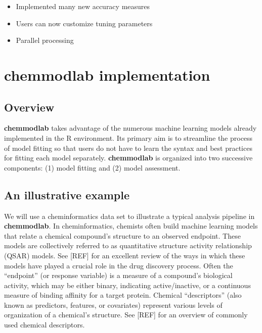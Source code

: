 \begin{itemize}
  \begin{itemize}
  \tightlist
  \item
    Implemented many new accuracy measures
  \item
    Users can now customize tuning parameters
  \item
    Parallel processing
  \end{itemize}
\end{itemize}

\section{chemmodlab implementation}\label{chemmodlab-implementation}

\subsection{Overview}\label{overview}

\textbf{chemmodlab} takes advantage of the numerous machine learning
models already implemented in the R environment. Its primary aim is to
streamline the process of model fitting so that users do not have to
learn the syntax and best practices for fitting each model separately.
\textbf{chemmodlab} is organized into two successive components: (1)
model fitting and (2) model assessment.

\subsection{An illustrative example}\label{an-illustrative-example}

We will use a cheminformatics data set to illustrate a typical analysis
pipeline in \textbf{chemmodlab}. In cheminformatics, chemists often
build machine learning models that relate a chemical compound's
structure to an observed endpoint. These models are collectively
referred to as quantitative structure activity relationship (QSAR)
models. See {[}REF{]} for an excellent review of the ways in which these
models have played a crucial role in the drug discovery process. Often
the ``endpoint'' (or response variable) is a measure of a compound's
biological activity, which may be either binary, indicating
active/inactive, or a continuous measure of binding affinity for a
target protein. Chemical ``descriptors'' (also known as predictors,
features, or covariates) represent various levels of organization of a
chemical's structure. See {[}REF{]} for an overview of commonly used
chemical descriptors.

